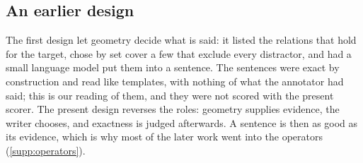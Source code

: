 \subsection{An earlier design}
\label{supp:failed}
The first design let geometry decide what is said: it listed the relations that hold for the target, chose by set cover a few that exclude every distractor, and had a small language model put them into a sentence.
The sentences were exact by construction and read like templates, with nothing of what the annotator had said; this is our reading of them, and they were not scored with the present scorer.
The present design reverses the roles: geometry supplies evidence, the writer chooses, and exactness is judged afterwards.
A sentence is then as good as its evidence, which is why most of the later work went into the operators (\cref{supp:operators}).

